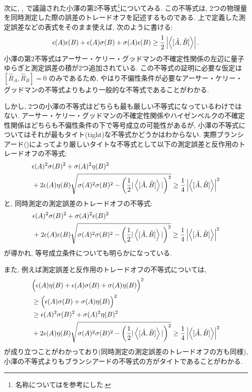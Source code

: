 次に, \cite{M.Ozawa2}, \cite{M.Ozawa3}で議論された小澤の第2不等式\footnote{名称については\cite{kondo}を参考にした.}についてみる. この不等式は, 2つの物理量を同時測定した際の誤差のトレードオフを記述するものである. 上で定義した測定誤差などの表式をそのまま使えば, 次のように書ける:
\begin{equation}
  \epsilon(A)\epsilon(B)+\epsilon(A)\sigma(B)+\sigma(A)\epsilon(B)\geq\frac{1}{2}\left|\ev{[\hat{A},\hat{B}]}\right|.
\end{equation}
小澤の第2不等式はアーサー・ケリー・グッドマンの不確定性関係の左辺に量子ゆらぎと測定誤差の積が2つ追加されている. この不等式の証明に必要な仮定は\([\hat{R}_A,\hat{R}_B]=0\) のみであるため, やはり不偏性条件が必要なアーサー・ケリー・グッドマンの不等式よりもより一般的な不等式であることがわかる. 

しかし, 2つの小澤の不等式はどちらも最も厳しい不等式になっているわけではない. アーサー・ケリー・グッドマンの不確定性関係やハイゼンベルクの不確定性関係はどちらも不偏性条件の下で等号成立の可能性があるが, 小澤の不等式についてはそれが最もタイト(tight)な不等式かどうかはわからない. 実際ブランシアード(\cite{Branciard})によってより厳しいタイトな不等式として以下の測定誤差と反作用のトレードオフの不等式:
\begin{equation}
    \begin{aligned}
    &\epsilon(A)^2\sigma(B)^2+\sigma(A)^2\eta(B)^2\\
    &+2\epsilon(A)\eta(B)\sqrt{\sigma(A)^2\sigma(B)^2-\left(\frac{1}{2}|\ev{[\hat
{A},\hat{B}]}|\right)^2}\geq\frac{1}{4}\left|\ev{[\hat{A},\hat{B}]}\right|^2
    \end{aligned}
\end{equation}
と, 同時測定の測定誤差のトレードオフの不等式:
\begin{equation}
    \begin{aligned}
        &\epsilon(A)^2\sigma(B)^2+\sigma(A)^2\epsilon(B)^2\\
    &+2\epsilon(A)\epsilon(B)\sqrt{\sigma(A)^2\sigma(B)^2-\left(\frac{1}{2}|\ev{[\hat
{A},\hat{B}]}|\right)^2}\geq\frac{1}{4}\left|\ev{[\hat{A},\hat{B}]}\right|^2
    \end{aligned}
\end{equation}
が導かれ, 等号成立条件についても明らかになっている.

また, 例えば測定誤差と反作用のトレードオフの不等式については, 
\begin{equation}
    \begin{aligned}
        &\Bigl(\epsilon(A)\eta(B)+\epsilon(A)\sigma(B)+\sigma(A)\eta(B)\Bigr)^2\\
        &\geq\Bigl(\epsilon(A)\sigma(B)+\sigma(A)\eta(B)\Bigr)^2\\
        &\geq\epsilon(A)^2\sigma(B)^2+\sigma(A)^2\eta(B)^2\\
    &+2\epsilon(A)\eta(B)\sqrt{\sigma(A)^2\sigma(B)^2-\left(\frac{1}{2}|\ev{[\hat
{A},\hat{B}]}|\right)^2}\geq\frac{1}{4}\left|\ev{[\hat{A},\hat{B}]}\right|^2\\
    \end{aligned}
\end{equation}
が成り立つことがわかっており(同時測定の測定誤差のトレードオフの方も同様), 小澤の不等式よりもブランシアードの不等式の方がタイトであることがわかる. 

